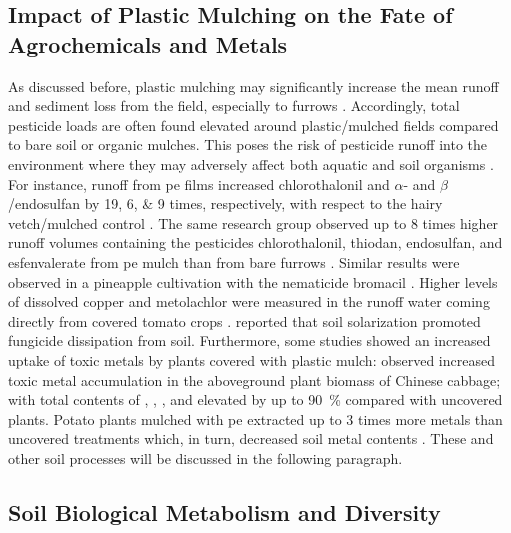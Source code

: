 \subsection{Impact of Plastic Mulching on the Fate of Agrochemicals and Metals}

As discussed before, plastic mulching may significantly increase the mean runoff and sediment loss from the field, especially to furrows \citep{WanRunoff1999,ZhangInfluences2014,ZhangDistribution2015}. Accordingly, total pesticide loads are often found elevated around plastic\-/mulched fields compared to bare soil or organic mulches. This poses the risk of pesticide runoff into the environment where they may adversely affect both aquatic and soil organisms \citep{ArnoldRunoff2004,DietrichFate2014}. For instance, runoff from \ac{pe} films increased chlorothalonil and $\alpha$- and $\beta$\-/endosulfan by \numlist{19;6;9} times, respectively, with respect to the hairy vetch\-/mulched control \citep{RiceRunoff2001}. The same research group observed up to \num{8} times higher runoff volumes containing the pesticides chlorothalonil, thiodan, endosulfan, and esfenvalerate from \ac{pe} mulch than from bare furrows \citep{RiceEvaluation2007}. Similar results were observed in a pineapple cultivation with the nematicide bromacil \citep{AlaviEvaluation2007}. Higher levels of dissolved copper and metolachlor were measured in the runoff water coming directly from covered tomato crops \citep{ArnoldRunoff2004,RiceComparison2002}. \citet{FenollSolarization2010} reported that soil solarization promoted fungicide dissipation from soil. Furthermore, some studies showed an increased uptake of toxic metals by plants covered with plastic mulch: \citet{MorenoAccumulation2002} observed increased toxic metal accumulation in the aboveground plant biomass of Chinese cabbage; with total contents of , , , and  elevated by up to \SI{90}{\percent} compared with uncovered plants. Potato plants mulched with \ac{pe} extracted up to \num{3} times more metals than uncovered treatments which, in turn, decreased soil metal contents \citep{BaghourInfluence2001,BaghourInfluence2002}. These and other soil processes will be discussed in the following paragraph.

\subsection{Soil Biological Metabolism and Diversity}

